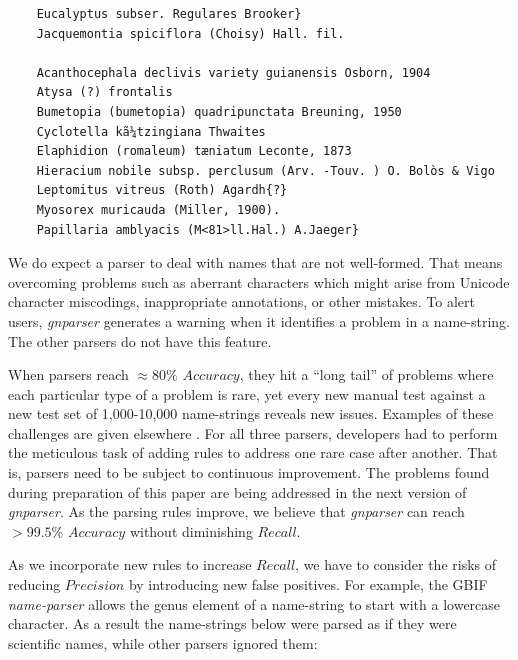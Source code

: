 \documentclass{bmcart}
\begin{document}
\vspace{0.5cm}
\begin{verbatim} 
    Eucalyptus subser. Regulares Brooker}
    Jacquemontia spiciflora (Choisy) Hall. fil.

    Acanthocephala declivis variety guianensis Osborn, 1904
    Atysa (?) frontalis
    Bumetopia (bumetopia) quadripunctata Breuning, 1950
    Cyclotella kã¼tzingiana Thwaites
    Elaphidion (romaleum) tæniatum Leconte, 1873
    Hieracium nobile subsp. perclusum (Arv. -Touv. ) O. Bolòs & Vigo
    Leptomitus vitreus (Roth) Agardh{?}
    Myosorex muricauda (Miller, 1900).
    Papillaria amblyacis (M<81>ll.Hal.) A.Jaeger}
\end{verbatim}

\vspace{0.5cm}

We do expect a parser to deal with names that are not well-formed. That means overcoming problems such as aberrant characters which might arise from Unicode character miscodings, inappropriate annotations, or other mistakes. To alert users,
\textit{gnparser} generates a warning when it identifies a problem in a name-string. The other parsers do not have this feature.

When parsers reach $\approx80\%$ $Accuracy$, they hit a ``long tail'' of
problems where each particular type of a problem is rare, yet every new manual
test against a new test set of 1,000-10,000 name-strings reveals new issues.  Examples of these
challenges are given elsewhere \cite{Patterson:inpress-a}. For all three
parsers, developers had to perform the meticulous task of adding rules to address one rare case after
another. That is, parsers need to be subject to continuous improvement. The problems found
during preparation of this paper are being addressed in the next version of
\textit{gnparser}. As the parsing rules improve, we believe that
\textit{gnparser} can reach $>99.5\%$ $Accuracy$ without diminishing $Recall$.

As we incorporate new rules to increase $Recall$, we have to consider the risks
of reducing $Precision$ by introducing new false positives. For example, the GBIF
\textit{name-parser} allows the genus element of a name-string to start with a
lowercase character. As a result the name-strings below were parsed as if they
were scientific names, while other parsers ignored them:

\vspace{0.5cm}
\end{document}

